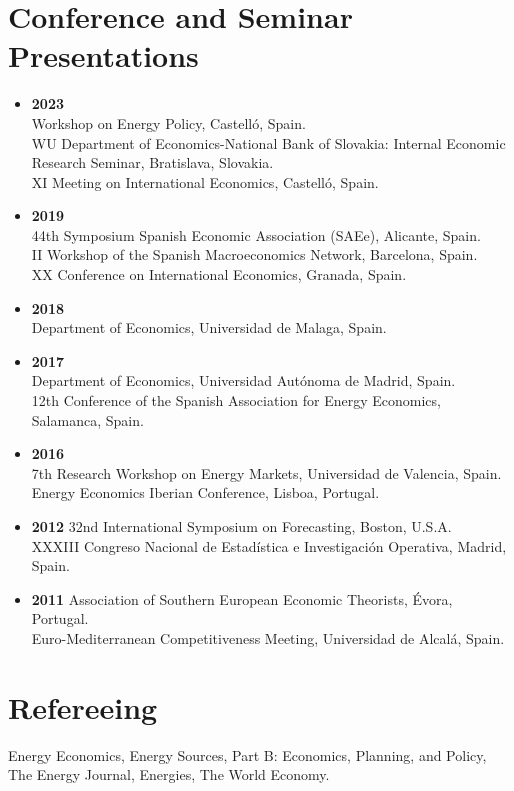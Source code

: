 \documentclass[11pt]{article}\usepackage[]{graphicx}\usepackage[usenames,dvipsnames]{xcolor}
\begin{document}
\section{Conference and Seminar Presentations} 
\begin{itemize}
  \item \textbf{2023}\\
  Workshop on Energy Policy, Castelló, Spain.\\
  WU Department of Economics-National Bank of Slovakia: Internal Economic Research Seminar, Bratislava, Slovakia.\\
  XI Meeting on International Economics, Castelló, Spain.
  \item \textbf{2019}\\
  44th Symposium Spanish Economic Association (SAEe), Alicante, Spain.\\
  II Workshop of the Spanish Macroeconomics Network, Barcelona, Spain.\\
  XX Conference on International Economics, Granada, Spain.
  \item \textbf{2018}\\
  Department of Economics, Universidad de Malaga, Spain.
  \item \textbf{2017}\\
  Department of Economics, Universidad Autónoma de Madrid, Spain.\\
  12th Conference of the Spanish Association for Energy Economics, Salamanca, Spain.
  \item \textbf{2016}\\
  7th Research Workshop on Energy Markets, Universidad de Valencia, Spain.\\
  Energy Economics Iberian Conference, Lisboa, Portugal.
  \item \textbf{2012} 32nd International Symposium on Forecasting, Boston, U.S.A.\\
  XXXIII Congreso Nacional de Estadística e Investigación Operativa, Madrid, Spain.
  \item \textbf{2011} Association of Southern European Economic Theorists, Évora, Portugal.\\
  Euro-Mediterranean Competitiveness Meeting, Universidad de Alcalá, Spain.
\end{itemize}

\section{Refereeing}
\raggedright
Energy Economics, Energy Sources, Part B: Economics, Planning, and Policy, The Energy Journal, Energies, The World Economy.\\
\end{document}
